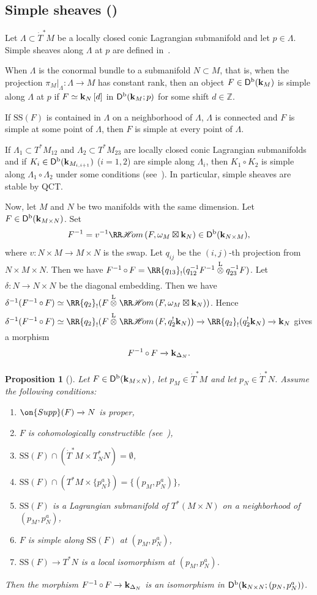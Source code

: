\documentclass[12pt,leqno]{article}
\newtheorem{proposition}[theorem]{Proposition}
\theoremstyle{definition}
\newcommand{\Z}{{\mathbb{Z}}}
\newcommand{\cor}{{\bf k}}
\renewcommand{\to}[1][]{\xrightarrow[]{#1}}
\newcommand{\rhom}[1][]{{\RR\mathscr{H}\mspace{-3mu}om}_{\raise1.5ex\hbox to.1em{}#1}}
\newcommand{\ltens}[1][]{\mathbin{\overset{\mathrm{L}}\otimes}_{#1}}
\newcommand{\etens}{\mathbin{\boxtimes}}
\newcommand{\conv}[1][]{\mathop{\circ}\limits_{#1}}
\newcommand{\reim}[1]{\RR{#1}_!}
\newcommand{\opb}[1]{#1^{-1}}
\newcommand{\epb}[1]{#1^{!}}
\newcommand{\cl}{\colon}
\newcommand{\lp}{{\rm(}}
\newcommand{\rp}{{\rm)}}
\newcommand{\bnum}{\begin{enumerate}[{\rm(i)}]}
\newcommand{\enum}{\end{enumerate}}
\newcommand{\eq}{\begin{eqnarray}}
\newcommand{\eneq}{\end{eqnarray}}
\newcommand{\Supp}{\on{Supp}}
\newcommand{\Der}[1][]{\mathsf{D}^{#1}}
\newcommand{\Derb}{\Der[\mathrm{b}]}
\newcommand{\SSi}{\mathrm{SS}}
\newcommand{\dT}{{\dot{T}}}
\newcommand{\dTM}{{\dT}^*M}
\numberwithin{equation}{section}
\begin{document}
\subsection{Simple sheaves (\cite[\S 7.5]{KS90})}
Let $\Lambda\subset\dTM$ be a locally closed conic Lagrangian
submanifold and let $p\in\Lambda$.
Simple sheaves along $\Lambda$ at $p$ 
are defined in~\cite[Def.~7.5.4]{KS90}. 

When $\Lambda$ is the conormal bundle to a submanifold
$N\subset M$, that is, when the projection $\pi_M\vert_\Lambda\cl\Lambda\to M$ has
constant rank, then an object 
$F\in\Derb(\cor_M)$ is simple along $\Lambda$ at
$p$ if $F\simeq\cor_N\,[d]$ in $\Derb(\cor_M;p)$ for some shift $d\in\Z$.

If $\SSi(F)$ is contained in $\Lambda$ on a neighborhood of $\Lambda$,
$\Lambda$ is connected and $F$ is simple at some point of $\Lambda$,
then $F$ is simple at every point of $\Lambda$.

If $\Lambda_1\subset T^*M_{12}$ and $\Lambda_2\subset T^*M_{23}$ are 
locally closed conic Lagrangian submanifolds and if 
$K_i\in\Derb(\cor_{M_{i,i+1}})$ ($i=1,2$) are simple along $\Lambda_i$,
then
$K_1\conv K_2$ is simple along $\Lambda_1\conv\Lambda_2$
under some conditions (see~\cite[Th.~7.5.11]{KS90}). 
In particular, simple sheaves are stable by QCT. 

Now, let $M$ and $N$ be two manifolds with the same dimension.
Let $F\in\Derb(\cor_{M\times N})$.
Set
\eq
F^{-1}=v^{-1}\rhom(F,\omega_M\etens\cor_N)\in\Derb(\cor_{N\times M}),
\label{def:invkern}
\eneq
where $v\cl N\times M\to M\times N$ is the swap.
Let $q_{ij}$ be the $(i,j)$-th projection from $N\times M\times N$.
Then we have 
$F^{-1}\conv F=\reim{q_{13}}(\opb{q_{12}}F^{-1}\ltens\opb{q_{23}}F)$.
Let $\delta\cl N\to N\times N$ be the diagonal embedding.
Then we have
$\opb{\delta}(F^{-1}\conv F)\simeq
\reim{q_2}(F\ltens \rhom(F,\omega_M\etens\cor_N))$.
Hence $\opb{\delta}(F^{-1}\conv F)\simeq
\reim{q_2}(F\ltens \rhom(F,\epb{q_2}\cor_N))
\to \reim{q_2}(\epb{q_2}\cor_N)\to\cor_N$
gives a morphism
$$F^{-1}\conv F\to\cor_{\Delta_N}.$$
\begin{proposition}%
[{\cite[Proposition 7.1.8, Proposition 7.1.9, Theorem 7.2.1]{KS90}}]%
\label{prop:invker}
Let $F\in\Derb(\cor_{M\times N})$, 
let $p_M\in\dTM$ and let $p_N\in\dT^* N$. Assume the following conditions:
\bnum
\item
$\Supp(F)\to N$ is proper,
\item $F$ is cohomologically constructible \lp see~{\rm \cite[Def.~3.4.1]{KS90}}\rp,
\item
$\SSi(F)\cap (\dTM\times T^*_NN)=\emptyset$,
\item
$\SSi(F)\cap (T^*M\times \{p_N^a\})=\{(p_M,p_N^a)\}$,
\item
$\SSi(F)$ is a Lagrangian submanifold of $T^*(M\times N)$ on a 
neighborhood of $(p_M,p_N^a)$,
\item
$F$ is simple along $\SSi(F)$
at $(p_M,p_N^a)$,
\item
$\SSi(F)\to T^*N$ is a local isomorphism 
at $(p_M,p_N^a)$. 
\enum
Then the morphism $F^{-1}\conv F\to\cor_{\Delta_N}$ is an isomorphism
in $\Derb(\cor_{N\times N};(p_N,p_N^a))$.
\end{proposition}
\end{document}
